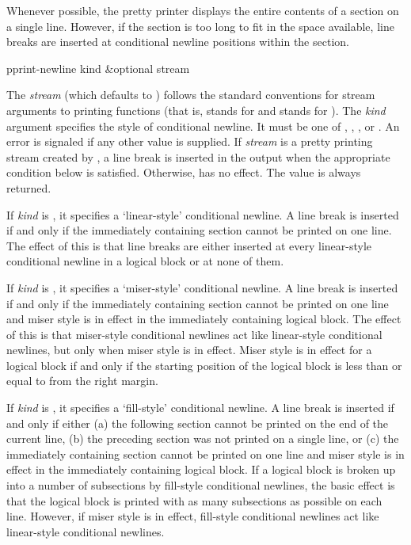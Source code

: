 Whenever possible, the pretty printer displays the entire contents of a
section on a single line.  However, if the section is too long to fit in
the space available, line breaks are inserted at conditional newline
positions within the section.

\begin{defun}[Function]
pprint-newline kind &optional stream 

The \emph{stream} (which defaults to ) follows the
standard conventions for stream arguments to printing functions (that is,
 stands for  and  stands for
).  The \emph{kind} argument specifies the style of
conditional newline.  It must be one of , ,
, or .  An error is signaled if any other value is
supplied.  If \emph{stream} is a pretty printing stream created by
, a line break is inserted in the output when the
appropriate condition below is satisfied.  Otherwise, 
has no effect.  The value  is always returned.

If \emph{kind} is , it specifies a `linear-style' conditional newline.
 A line break is inserted if and only if the immediately containing section
cannot be printed on one line.  The effect of this is that line breaks are
either inserted at every linear-style conditional newline in a logical
block or at none of them.

If \emph{kind} is , it specifies a `miser-style' conditional newline. 
A line break is inserted if and only if the immediately containing section
cannot be printed on one line and miser style is in effect in the
immediately containing logical block.  The effect of this is that
miser-style conditional newlines act like linear-style conditional
newlines, but only when miser style is in effect.  Miser style is in effect
for a logical block if and only if the starting position of the logical
block is less than or equal to  from the right margin.

If \emph{kind} is , it specifies a `fill-style' conditional
newline.  A line break is inserted if and only if either (a) the following
section cannot be printed on the end of the current line, (b) the preceding
section was not printed on a single line, or (c) the immediately containing
section cannot be printed on one line and miser style is in effect in the
immediately containing logical block.  If a logical block is broken up into
a number of subsections by fill-style conditional newlines, the basic
effect is that the logical block is printed with as many subsections as
possible on each line.  However, if miser style is in effect, fill-style
conditional newlines act like linear-style conditional newlines.


\end{defun}
